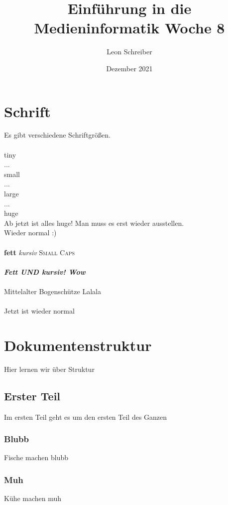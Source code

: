 \documentclass{article}
\title{Einführung in die Medieninformatik Woche 8}
\author{Leon Schreiber}
\date{Dezember 2021}
\begin{document}
\maketitle

\newpage

\section{Schrift}
Es gibt verschiedene Schriftgrößen. \\\\
\tiny tiny \\
... \\
\small small \\
... \\
\large large \\
... \\
\huge huge \\
Ab jetzt ist alles huge! Man muss es erst wieder ausstellen.
\\
\normalsize Wieder normal :)
\\\\
\textbf{fett} \textit{kursiv} \textsc{Small Caps}
\\\\
\textit{\textbf{Fett UND kursiv! Wow}}
\\\\
\unclfamily Mittelalter Bogenschütze Lalala
\\\\
\normalfont Jetzt ist wieder normal

\newpage

\section{Dokumentenstruktur}
Hier lernen wir über Struktur
\subsection{Erster Teil}
Im ersten Teil geht es um den ersten Teil des Ganzen
\subsubsection{Blubb}
Fische machen blubb
\subsubsection{Muh}
Kühe machen muh
\end{document}
